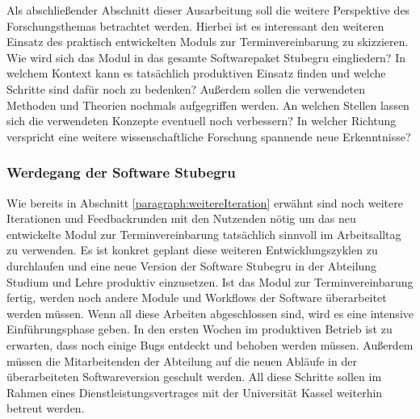 Als abschließender Abschnitt dieser Ausarbeitung soll die weitere Perspektive
des Forschungsthemas betrachtet werden. Hierbei ist es interessant den weiteren
Einsatz des praktisch entwickelten Moduls zur Terminvereinbarung zu skizzieren.
Wie wird sich das Modul in das gesamte Softwarepaket Stubegru eingliedern? In
welchem Kontext kann es tatsächlich produktiven Einsatz finden und welche
Schritte sind dafür noch zu bedenken? Außerdem sollen die verwendeten Methoden
und Theorien nochmals aufgegriffen werden. An welchen Stellen lassen sich die
verwendeten Konzepte eventuell noch verbessern? In welcher Richtung verspricht
eine weitere wissenschaftliche Forschung spannende neue Erkenntnisse?

\subsubsection{Werdegang der Software Stubegru}
Wie bereits in Abschnitt \ref{paragraph:weitereIteration} erwähnt sind noch
weitere Iterationen und Feedbackrunden mit den Nutzenden nötig um das neu
entwickelte Modul zur Terminvereinbarung tatsächlich sinnvoll im Arbeitsalltag
zu verwenden. Es ist konkret geplant diese weiteren Entwicklungszyklen zu
durchlaufen und eine neue Version der Software Stubegru in der Abteilung
Studium und Lehre produktiv einzusetzen. Ist das Modul zur Terminvereinbarung
fertig, werden noch andere Module und Workflows der Software überarbeitet
werden müssen. Wenn all diese Arbeiten abgeschlossen sind, wird es eine
intensive Einführungsphase geben. In den ersten Wochen im produktiven Betrieb
ist zu erwarten, dass noch einige Bugs entdeckt und behoben werden müssen.
Außerdem müssen die Mitarbeitenden der Abteilung auf die neuen Abläufe in der
überarbeiteten Softwareversion geschult werden. All diese Schritte sollen im
Rahmen eines Dienstleistungsvertrages mit der Universität Kassel weiterhin
betreut werden.


